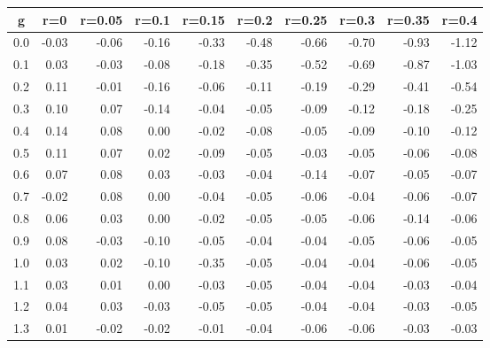 %
\begin{table}[!tbp]
 \begin{center}
 \begin{tabular}{rrrrrrrrrr}\hline\hline
\multicolumn{1}{c}{g}&\multicolumn{1}{c}{r=0}&\multicolumn{1}{c}{r=0.05}&\multicolumn{1}{c}{r=0.1}&\multicolumn{1}{c}{r=0.15}&\multicolumn{1}{c}{r=0.2}&\multicolumn{1}{c}{r=0.25}&\multicolumn{1}{c}{r=0.3}&\multicolumn{1}{c}{r=0.35}&\multicolumn{1}{c}{r=0.4}\tabularnewline
\hline
0.0&-0.03&-0.06&-0.16&-0.33&-0.48&-0.66&-0.70&-0.93&-1.12\tabularnewline
0.1& 0.03&-0.03&-0.08&-0.18&-0.35&-0.52&-0.69&-0.87&-1.03\tabularnewline
0.2& 0.11&-0.01&-0.16&-0.06&-0.11&-0.19&-0.29&-0.41&-0.54\tabularnewline
0.3& 0.10& 0.07&-0.14&-0.04&-0.05&-0.09&-0.12&-0.18&-0.25\tabularnewline
0.4& 0.14& 0.08& 0.00&-0.02&-0.08&-0.05&-0.09&-0.10&-0.12\tabularnewline
0.5& 0.11& 0.07& 0.02&-0.09&-0.05&-0.03&-0.05&-0.06&-0.08\tabularnewline
0.6& 0.07& 0.08& 0.03&-0.03&-0.04&-0.14&-0.07&-0.05&-0.07\tabularnewline
0.7&-0.02& 0.08& 0.00&-0.04&-0.05&-0.06&-0.04&-0.06&-0.07\tabularnewline
0.8& 0.06& 0.03& 0.00&-0.02&-0.05&-0.05&-0.06&-0.14&-0.06\tabularnewline
0.9& 0.08&-0.03&-0.10&-0.05&-0.04&-0.04&-0.05&-0.06&-0.05\tabularnewline
1.0& 0.03& 0.02&-0.10&-0.35&-0.05&-0.04&-0.04&-0.06&-0.05\tabularnewline
1.1& 0.03& 0.01& 0.00&-0.03&-0.05&-0.04&-0.04&-0.03&-0.04\tabularnewline
1.2& 0.04& 0.03&-0.03&-0.05&-0.05&-0.04&-0.04&-0.03&-0.05\tabularnewline
1.3& 0.01&-0.02&-0.02&-0.01&-0.04&-0.06&-0.06&-0.03&-0.03\tabularnewline
\hline
\end{tabular}

\end{center}

\end{table}

